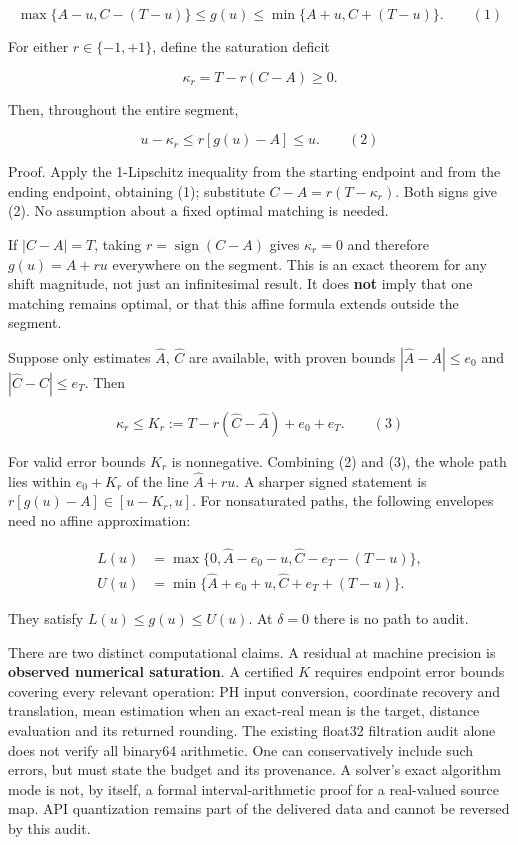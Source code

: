 \documentclass[
  11pt,
]{article}
\begin{document}
\[
\max\{A-u,C-(T-u)\}\leq g(u)\leq\min\{A+u,C+(T-u)\}.\qquad (1)
\]

For either \(r\in \{-1,+1\}\), define the saturation deficit

\[
\kappa_r=T-r(C-A)\geq0.
\]

Then, throughout the entire segment,

\[
u-\kappa_r\leq r[g(u)-A]\leq u.\qquad (2)
\]

Proof. Apply the 1-Lipschitz inequality from the starting endpoint and
from the ending endpoint, obtaining (1); substitute
\(C-A=r(T-\kappa_r)\). Both signs give (2). No assumption about a fixed
optimal matching is needed.

If \(|C-A|=T\), taking \(r=\operatorname{sign}(C-A)\) gives
\(\kappa_r=0\) and therefore \(g(u)=A+ru\) everywhere on the segment.
This is an exact theorem for any shift magnitude, not just an
infinitesimal result. It does \textbf{not} imply that one matching
remains optimal, or that this affine formula extends outside the
segment.

Suppose only estimates \(\widehat A\), \(\widehat C\) are available,
with proven bounds \(|\widehat A-A|\leq e_0\) and
\(|\widehat C-C|\leq e_T\). Then

\[
\kappa_r\leq K_r:=T-r(\widehat C-\widehat A)+e_0+e_T.\qquad (3)
\]

For valid error bounds \(K_r\) is nonnegative. Combining (2) and (3),
the whole path lies within \(e_0+K_r\) of the line \(\widehat A+ru\). A
sharper signed statement is \(r[g(u)-A]\in [u-K_r,u]\). For nonsaturated
paths, the following envelopes need no affine approximation:

\[
\begin{aligned}L(u)&=\max\{0,\widehat A-e_0-u,\widehat C-e_T-(T-u)\},\\ U(u)&=\min\{\widehat A+e_0+u,\widehat C+e_T+(T-u)\}.\end{aligned}
\]

They satisfy \(L(u)\leq g(u)\leq U(u)\). At \(\delta=0\) there is no
path to audit.

There are two distinct computational claims. A residual at machine
precision is \textbf{observed numerical saturation}. A certified \(K\)
requires endpoint error bounds covering every relevant operation: PH
input conversion, coordinate recovery and translation, mean estimation
when an exact-real mean is the target, distance evaluation and its
returned rounding. The existing float32 filtration audit alone does not
verify all binary64 arithmetic. One can conservatively include such
errors, but must state the budget and its provenance. A solver's exact
algorithm mode is not, by itself, a formal interval-arithmetic proof for
a real-valued source map. API quantization remains part of the delivered
data and cannot be reversed by this audit.
\end{document}
